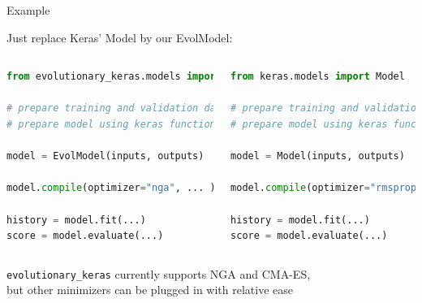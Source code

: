 \begin{frame}[fragile]{Example}

Just replace Keras' Model by our EvolModel:
\vspace*{-10pt}
\begin{columns}[onlytextwidth]
\begin{lstlisting}[language=Python, basicstyle=\tiny]
from evolutionary_keras.models import EvolModel

# prepare training and validation data
# prepare model using keras functional API

model = EvolModel(inputs, outputs)

model.compile(optimizer="nga", ... )

history = model.fit(...)
score = model.evaluate(...)
\end{lstlisting} 

\begin{lstlisting}[language=Python, basicstyle=\tiny]
from keras.models import Model

# prepare training and validation data
# prepare model using keras functional API

model = Model(inputs, outputs)

model.compile(optimizer="rmsprop", ... )

history = model.fit(...)
score = model.evaluate(...)
\end{lstlisting} 
\end{columns}

\texttt{evolutionary\_keras} currently supports NGA and CMA-ES, \\ 
but other minimizers can be plugged in with relative ease \\
\end{frame}



